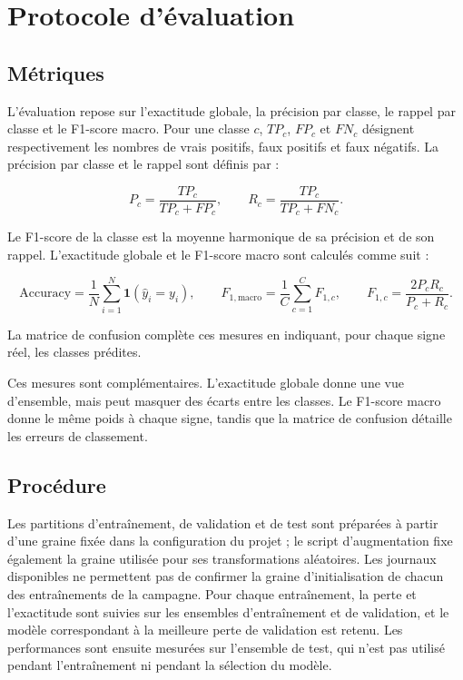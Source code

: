 \section{Protocole d'évaluation}

\subsection{Métriques}

L'évaluation repose sur l'exactitude globale, la précision par classe, le rappel par classe et le F1-score macro. Pour une classe \(c\), \(TP_c\), \(FP_c\) et \(FN_c\) désignent respectivement les nombres de vrais positifs, faux positifs et faux négatifs. La précision par classe et le rappel sont définis par :

\[
P_c = \frac{TP_c}{TP_c + FP_c},
\qquad
R_c = \frac{TP_c}{TP_c + FN_c}.
\]

Le F1-score de la classe est la moyenne harmonique de sa précision et de son rappel. L'exactitude globale et le F1-score macro sont calculés comme suit :

\[
\mathrm{Accuracy} = \frac{1}{N}\sum_{i=1}^{N}\mathbf{1}(\hat{y}_i = y_i),
\qquad
F_{1,\mathrm{macro}} = \frac{1}{C}\sum_{c=1}^{C} F_{1,c},
\qquad
F_{1,c} = \frac{2P_cR_c}{P_c + R_c}.
\]

La matrice de confusion complète ces mesures en indiquant, pour chaque signe réel, les classes prédites.

Ces mesures sont complémentaires. L'exactitude globale donne une vue d'ensemble, mais peut masquer des écarts entre les classes. Le F1-score macro donne le même poids à chaque signe, tandis que la matrice de confusion détaille les erreurs de classement.

\subsection{Procédure}

Les partitions d'entraînement, de validation et de test sont préparées à partir d'une graine fixée dans la configuration du projet ; le script d'augmentation fixe également la graine utilisée pour ses transformations aléatoires. Les journaux disponibles ne permettent pas de confirmer la graine d'initialisation de chacun des entraînements de la campagne. Pour chaque entraînement, la perte et l'exactitude sont suivies sur les ensembles d'entraînement et de validation, et le modèle correspondant à la meilleure perte de validation est retenu. Les performances sont ensuite mesurées sur l'ensemble de test, qui n'est pas utilisé pendant l'entraînement ni pendant la sélection du modèle.

